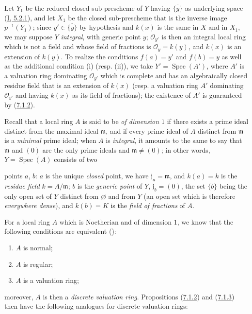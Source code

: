 Let $Y_1$ be the reduced closed sub-prescheme of $Y$ having
$\overline{\{y\}}$ as underlying space
(\hyperref[I.5.2.1]{I, 5.2.1}), and let $X_1$ be the closed sub-prescheme
that is the inverse image $p^{-1}(Y_1)$; since $y'\in\overline{\{y\}}$ by
hypothesis and $k(x)$ is the same in $X$ and in $X_1$, we may suppose $Y$
\emph{integral}, with generic point $y$; $\mathcal{O}_{y'}$ is then an
integral local ring which is not a field and whose field of fractions
is $\mathcal{O}_y=k(y)$, and $k(x)$ is an extension of $k(y)$. To
realize the conditions $f(a)=y'$ and $f(b)=y$ as well as the
additional condition (i) (resp. (ii)), we take
$Y'=\operatorname{Spec}(A')$, where $A'$ is a valuation ring dominating
$\mathcal{O}_{y'}$ which is complete and has an algebraically closed residue
field that is an extension of $k(x)$ (resp. a valuation ring $A'$
dominating $\mathcal{O}_{y'}$ and having $k(x)$ as its field of fractions);
the existence of $A'$ is guaranteed by
(\hyperref[II.7.1.2]{7.1.2}).

\begin{env}[7.1.5]
\label{II.7.1.5}
Recall that a local ring $A$ is said to be \emph{of dimension $1$} if there
exists a prime ideal distinct from the maximal ideal $\mathfrak{m}$, and if
every prime ideal of $A$ distinct from $\mathfrak{m}$ is a \emph{minimal}
prime ideal; when $A$ is \emph{integral}, it amounts to the same to say
that $\mathfrak{m}$ and $(0)$ are the only prime ideals and
$\mathfrak{m}\neq(0)$; in other words, $Y=\operatorname{Spec}(A)$
consists of two


points $a$, $b$: $a$ is the unique \emph{closed} point, we have
$\mathfrak{j}_a=\mathfrak{m}$, and $k(a)=k$ is the \emph{residue field}
$k=A/\mathfrak{m}$; $b$ is the \emph{generic point} of $Y$,
$\mathfrak{j}_b=(0)$, the set $\{b\}$ being the only open set of
$Y$ distinct from $\varnothing$ and from $Y$ (an open set which is therefore
\emph{everywhere dense}), and $k(b)=K$ is the \emph{field of fractions} of $A$.
\end{env}

\begin{env}[7.1.6]
\label{II.7.1.6}
For a local ring $A$ which is Noetherian and of dimension $1$, we know that
the following conditions are equivalent
(\cite[p.~2-08 and 17-01]{I-1}):
\begin{enumerate}
\item[\rm{a)}] $A$ is normal;
\item[\rm{b)}] $A$ is regular;
\item[\rm{c)}] $A$ is a valuation ring;
\end{enumerate}
moreover, $A$ is then a \emph{discrete valuation ring}. Propositions
(\hyperref[II.7.1.2]{7.1.2}) and
(\hyperref[II.7.1.3]{7.1.3}) then have the following analogues for
discrete valuation rings:
\end{env}

